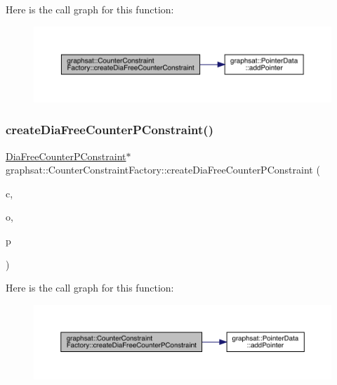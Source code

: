 Here is the call graph for this function\+:\nopagebreak
\begin{figure}[H]
\begin{center}
\leavevmode
\includegraphics[width=350pt]{classgraphsat_1_1_counter_constraint_factory_aca06d5896ce73cd048aadc97feea88f7_cgraph}
\end{center}
\end{figure}
\mbox{\label{classgraphsat_1_1_counter_constraint_factory_a836f8b3c15398bb05721c05742713f69}} 
\subsubsection{\texorpdfstring{createDiaFreeCounterPConstraint()}{createDiaFreeCounterPConstraint()}}
{\footnotesize\ttfamily \mbox{\hyperlink{classgraphsat_1_1_dia_free_counter_p_constraint}{Dia\+Free\+Counter\+P\+Constraint}}$\ast$ graphsat\+::\+Counter\+Constraint\+Factory\+::create\+Dia\+Free\+Counter\+P\+Constraint (\begin{DoxyParamCaption}\item[{int}]{c,  }\item[{\mbox{\hyperlink{namespacegraphsat_acfb5939f9bdafbd9aea0d084b9a56f69}{C\+O\+M\+P\+\_\+\+O\+P\+E\+R\+A\+T\+OR}}}]{o,  }\item[{int}]{p }\end{DoxyParamCaption})\hspace{0.3cm}{\ttfamily [inline]}}

Here is the call graph for this function\+:\nopagebreak
\begin{figure}[H]
\begin{center}
\leavevmode
\includegraphics[width=350pt]{classgraphsat_1_1_counter_constraint_factory_a836f8b3c15398bb05721c05742713f69_cgraph}
\end{center}
\end{figure}
\mbox{\label{classgraphsat_1_1_counter_constraint_factory_a7372d026e014236a543dce09909406de}} 
